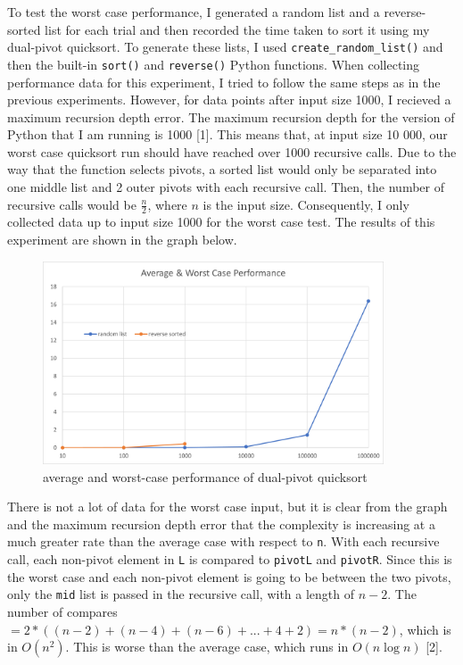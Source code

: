 \documentclass[12pt]{article}
\begin{document}
To test the worst case performance, I generated a random list and a reverse-sorted list for each trial and then recorded the time taken to sort it using my dual-pivot quicksort. To generate these lists, I used \verb+create_random_list()+ and then the built-in \verb+sort()+ and \verb+reverse()+ Python functions. When collecting performance data for this experiment, I tried to follow the same steps as in the previous experiments. However, for data points after input size 1000, I recieved a maximum recursion depth error. The maximum recursion depth for the version of Python that I am running is 1000 [1]. This means that, at input size 10 000, our worst case quicksort run should have reached over 1000 recursive calls. Due to the way that the function selects pivots, a sorted list would only be separated into one middle list and 2 outer pivots with each recursive call. Then, the number of recursive calls would be $\frac{n}{2}$, where $n$ is the input size. 
Consequently, I only collected data up to input size 1000 for the worst case test. The results of this experiment are shown in the graph below. 

\begin{figure}[H]
\centering
\includegraphics[width=0.9\textwidth,height=\textheight,keepaspectratio]{worst_case}
\caption{average and worst-case performance of dual-pivot quicksort}
\label{Figure: w1}
\end{figure}

\noindent There is not a lot of data for the worst case input, but it is clear from the graph and the maximum recursion depth error that the complexity is increasing at a much greater rate than the average case with respect to \verb+n+. With each recursive call, each non-pivot element in \verb+L+ is compared to \verb+pivotL+ and \verb+pivotR+. Since this is the worst case and each non-pivot element is going to be between the two pivots, only the \verb+mid+ list is passed in the recursive call, with a length of $n-2$. The number of compares $= 2*((n-2) + (n-4) + (n-6) + ... + 4 + 2) = n*(n-2)$, which is in $O(n^2)$. This is worse than the average case, which runs in $O(n\log{n})$ [2].
\end{document}
